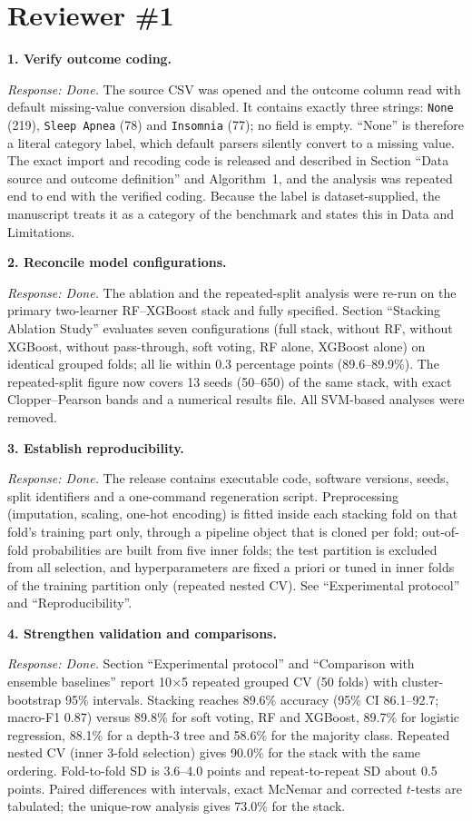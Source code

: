 \documentclass[11pt,a4paper]{article}
\newcommand{\rc}[2]{\par\medskip\noindent\textbf{#1}\par\noindent\textit{Response: Done.} #2\par}
\begin{document}
\section*{Reviewer \#1}
\rc{1. Verify outcome coding.}{The source CSV was opened and the outcome column read with default missing-value conversion disabled. It contains exactly three strings: \texttt{None} (219), \texttt{Sleep Apnea} (78) and \texttt{Insomnia} (77); no field is empty. ``None'' is therefore a literal category label, which default parsers silently convert to a missing value. The exact import and recoding code is released and described in Section ``Data source and outcome definition'' and Algorithm~1, and the analysis was repeated end to end with the verified coding. Because the label is dataset-supplied, the manuscript treats it as a category of the benchmark and states this in Data and Limitations.}
\rc{2. Reconcile model configurations.}{The ablation and the repeated-split analysis were re-run on the primary two-learner RF--XGBoost stack and fully specified. Section ``Stacking Ablation Study'' evaluates seven configurations (full stack, without RF, without XGBoost, without pass-through, soft voting, RF alone, XGBoost alone) on identical grouped folds; all lie within 0.3 percentage points (89.6--89.9\%). The repeated-split figure now covers 13 seeds (50--650) of the same stack, with exact Clopper--Pearson bands and a numerical results file. All SVM-based analyses were removed.}
\rc{3. Establish reproducibility.}{The release contains executable code, software versions, seeds, split identifiers and a one-command regeneration script. Preprocessing (imputation, scaling, one-hot encoding) is fitted inside each stacking fold on that fold's training part only, through a pipeline object that is cloned per fold; out-of-fold probabilities are built from five inner folds; the test partition is excluded from all selection, and hyperparameters are fixed a priori or tuned in inner folds of the training partition only (repeated nested CV). See ``Experimental protocol'' and ``Reproducibility''.}
\rc{4. Strengthen validation and comparisons.}{Section ``Experimental protocol'' and ``Comparison with ensemble baselines'' report 10$\times$5 repeated grouped CV (50 folds) with cluster-bootstrap 95\% intervals. Stacking reaches 89.6\% accuracy (95\% CI 86.1--92.7; macro-F1 0.87) versus 89.8\% for soft voting, RF and XGBoost, 89.7\% for logistic regression, 88.1\% for a depth-3 tree and 58.6\% for the majority class. Repeated nested CV (inner 3-fold selection) gives 90.0\% for the stack with the same ordering. Fold-to-fold SD is 3.6--4.0 points and repeat-to-repeat SD about 0.5 points. Paired differences with intervals, exact McNemar and corrected $t$-tests are tabulated; the unique-row analysis gives 73.0\% for the stack.}
\end{document}
